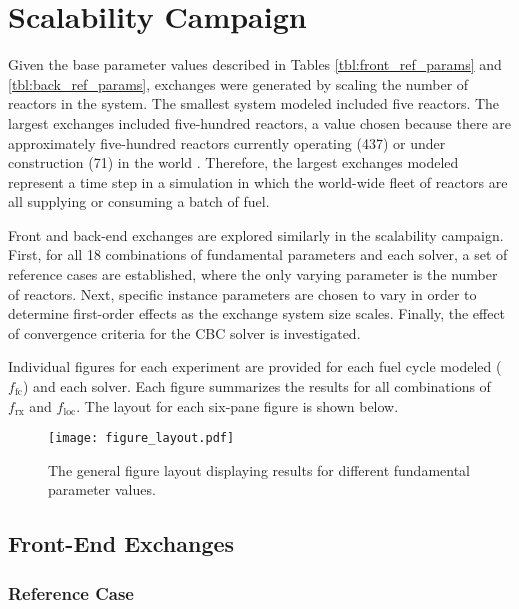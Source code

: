 
\section{Scalability Campaign}\label{results:scale}

Given the base parameter values described in Tables \ref{tbl:front_ref_params}
and \ref{tbl:back_ref_params}, exchanges were generated by scaling the number of
reactors in the system. The smallest system modeled included five reactors. The
largest exchanges included five-hundred reactors, a value chosen because there
are approximately five-hundred reactors currently operating (437) or under
construction (71) in the world \cite{nrxtrs}. Therefore, the largest exchanges
modeled represent a time step in a simulation in which the world-wide fleet of
reactors are all supplying or consuming a batch of fuel.

Front and back-end exchanges are explored similarly in the scalability
campaign. First, for all 18 combinations of fundamental parameters and each
solver, a set of reference cases are established, where the only varying
parameter is the number of reactors. Next, specific instance parameters are
chosen to vary in order to determine first-order effects as the exchange system
size scales. Finally, the effect of convergence criteria for the CBC solver is
investigated.

Individual figures for each experiment are provided for each fuel cycle modeled
($f_\text{fc}$) and each solver. Each figure summarizes the results for all
combinations of $f_\text{rx}$ and $f_\text{loc}$. The layout for each six-pane
figure is shown below.

\begin{figure}[h!]
  \begin{center}
    \texttt{[image: figure\_layout.pdf]}
    \caption{
      \label{fig:figure_layout}
      The general figure layout displaying results for different fundamental
      parameter values.}
  \end{center}
\end{figure}

\subsection{Front-End Exchanges}

\subsubsection{Reference Case}

